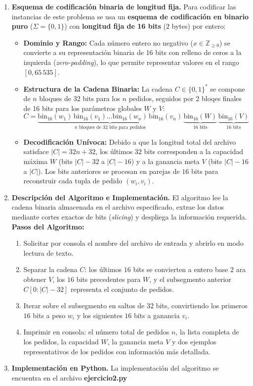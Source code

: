 \begin{enumerate}[label=(\alph*), leftmargin=*]
    \item \textbf{Esquema de codificación binaria de longitud fija.}
    Para codificar las instancias de este problema se usa un \textbf{esquema de codificación en binario puro} ($\Sigma = \{0,1\}$) con \textbf{longitud fija de 16 bits} ($2$ bytes) por entero:
    \begin{itemize}[leftmargin=*]
        \item \textbf{Dominio y Rango:} Cada número entero no negativo ($x \in \mathbb{Z}_{\ge 0}$) se convierte a su representación binaria de 16 bits con relleno de ceros a la izquierda (\textit{zero-padding}), lo que permite representar valores en el rango $[0, 65\, 535]$.
        \item \textbf{Estructura de la Cadena Binaria:} La cadena $C\in \{0,1\}^*$ se compone de $n$ bloques de 32 bits para los $n$ pedidos, seguidos por 2 bloqes finales de 16 bits para los parámetros globales $W$ y $V$:
        \[
        C = \underbrace{\text{bin}_{16}(w_1) \, \text{bin}_{16}(v_1) \dots \text{bin}_{16}(w_n) \, \text{bin}_{16}(v_n)}_{n \text{ bloques de } 32 \text{ bits para pedidos}} \, \underbrace{\text{bin}_{16}(W)}_{16 \text{ bits}} \, \underbrace{\text{bin}_{16}(V)}_{16 \text{ bits}}
        \]
        \item \textbf{Decodificación Unívoca:}
        Debido a que la longitud total del archivo satisface $|C|= 32n + 32$, los últimos $32$ bits corresponden a la capacidad máxima $W$ (bits $|C|-32$ a $|C|-16$) y a la ganancia meta $V$ (bits $|C|-16$ a $|C|$). Los bits anteriores se procesan en parejas de $16$ bits para reconstruir cada tupla de pedido $(w_i, v_i)$.
    \end{itemize}
    \item \textbf{Descripción del Algoritmo e Implementación.}
    El algoritmo lee la cadena binaria almacenada en el archivo especificado, extrae los datos mediante cortes exactos de bits (\textit{slicing}) y despliega la información requerida.
    \textbf{Pasos del Algoritmo:}
    \begin{enumerate}[label=\arabic*.]
        \item Solicitar por consola el nombre del archivo de entrada y abrirlo en modo lectura de texto.
        \item Separar la cadena $C$: los últimos $16$ bits se convierten a entero base 2 ara obtener $V$, los $16$ bits precedentes para $W$, y el subsegmento anterior $C[0 : |C|-32]$ representa el conjunto de pedidos.
        \item Iterar sobre el subsegmento en saltos de $32$ bits, convirtiendo los primeros $16$ bits a peso $w_i$ y los siguientes $16$ bits a ganancia $v_i$.
        \item Imprimir en consola: el número total de pedidos $n$, la lista completa de los pedidos, la capacidad $W$, la ganancia meta $V$ y dos ejemplos representativos de los pedidos con información más detallada.
    \end{enumerate}
    \item \textbf{Implementación en Python.}
    La implementación del algoritmo se encuentra en el archivo \textbf{ejercicio2.py}
    
    
\end{enumerate}